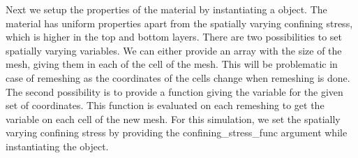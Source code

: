\documentclass[letterpaper,10pt,english]{sphinxmanual}
\begin{document}
\sphinxAtStartPar
Next we setup the properties of the material by instantiating a  object. The material has uniform properties apart from the spatially varying confining stress, which is higher in the top and bottom layers. There are two possibilities to set spatially varying variables. We can either provide an array with the size of the mesh, giving them in each of the cell of the mesh. This will be problematic in case of re\sphinxhyphen{}meshing as the coordinates of the cells change when re\sphinxhyphen{}meshing is done. The second possibility is to provide a function giving the variable for the given set of coordinates. This function is evaluated on each re\sphinxhyphen{}meshing to get the variable on each cell of the new mesh. For this simulation, we set the spatially varying confining stress by providing the confining\_stress\_func argument while instantiating the  object.

\begin{sphinxVerbatim}[commandchars=\\\{\}]
   

                              
                   
         
                              

  
       
         
         

  
\end{sphinxVerbatim}
\end{document}
